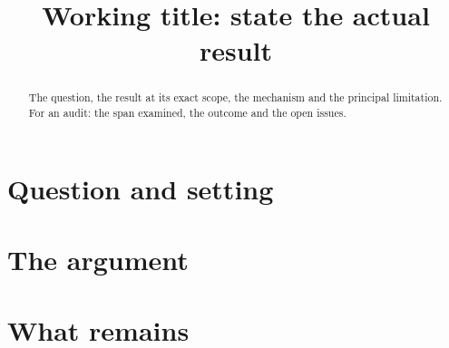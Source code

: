 \documentclass[11pt,reqno]{amsart}
\title[Short running title]{Working title: state the actual result}
\date{}
\theoremstyle{definition}
\theoremstyle{remark}
\numberwithin{equation}{section}
\begin{document}
\begin{abstract}
The question, the result at its exact scope, the mechanism and the principal
limitation. For an audit: the span examined, the outcome and the open issues.
\end{abstract}
\maketitle

\section{Question and setting}

\section{The argument}

\section{What remains}

\end{document}

